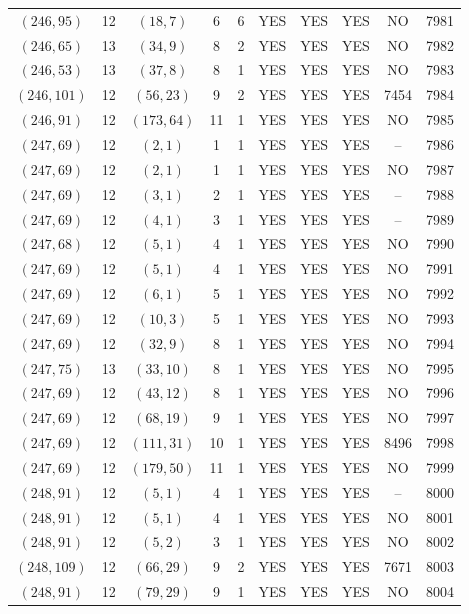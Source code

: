 \begin{longtable}{|c|c|c|c|c|c|c|c|c|c|}
$(246, 95)$ & 12 & $(18, 7)$ & 6 & 6 & YES & YES & YES & NO & 7981\\
$(246, 65)$ & 13 & $(34, 9)$ & 8 & 2 & YES & YES & YES & NO & 7982\\
$(246, 53)$ & 13 & $(37, 8)$ & 8 & 1 & YES & YES & YES & NO & 7983\\
$(246, 101)$ & 12 & $(56, 23)$ & 9 & 2 & YES & YES & YES & 7454 & 7984\\
$(246, 91)$ & 12 & $(173, 64)$ & 11 & 1 & YES & YES & YES & NO & 7985\\
$(247, 69)$ & 12 & $(2, 1)$ & 1 & 1 & YES & YES & YES & -- & 7986\\
$(247, 69)$ & 12 & $(2, 1)$ & 1 & 1 & YES & YES & YES & NO & 7987\\
$(247, 69)$ & 12 & $(3, 1)$ & 2 & 1 & YES & YES & YES & -- & 7988\\
$(247, 69)$ & 12 & $(4, 1)$ & 3 & 1 & YES & YES & YES & -- & 7989\\
$(247, 68)$ & 12 & $(5, 1)$ & 4 & 1 & YES & YES & YES & NO & 7990\\
$(247, 69)$ & 12 & $(5, 1)$ & 4 & 1 & YES & YES & YES & NO & 7991\\
$(247, 69)$ & 12 & $(6, 1)$ & 5 & 1 & YES & YES & YES & NO & 7992\\
$(247, 69)$ & 12 & $(10, 3)$ & 5 & 1 & YES & YES & YES & NO & 7993\\
$(247, 69)$ & 12 & $(32, 9)$ & 8 & 1 & YES & YES & YES & NO & 7994\\
$(247, 75)$ & 13 & $(33, 10)$ & 8 & 1 & YES & YES & YES & NO & 7995\\
$(247, 69)$ & 12 & $(43, 12)$ & 8 & 1 & YES & YES & YES & NO & 7996\\
$(247, 69)$ & 12 & $(68, 19)$ & 9 & 1 & YES & YES & YES & NO & 7997\\
$(247, 69)$ & 12 & $(111, 31)$ & 10 & 1 & YES & YES & YES & 8496 & 7998\\
$(247, 69)$ & 12 & $(179, 50)$ & 11 & 1 & YES & YES & YES & NO & 7999\\
$(248, 91)$ & 12 & $(5, 1)$ & 4 & 1 & YES & YES & YES & -- & 8000\\
$(248, 91)$ & 12 & $(5, 1)$ & 4 & 1 & YES & YES & YES & NO & 8001\\
$(248, 91)$ & 12 & $(5, 2)$ & 3 & 1 & YES & YES & YES & NO & 8002\\
$(248, 109)$ & 12 & $(66, 29)$ & 9 & 2 & YES & YES & YES & 7671 & 8003\\
$(248, 91)$ & 12 & $(79, 29)$ & 9 & 1 & YES & YES & YES & NO & 8004\\

\end{longtable}
